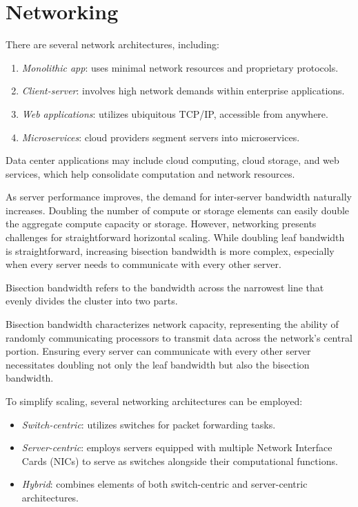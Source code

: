 \section{Networking}

There are several network architectures, including:
\begin{enumerate}
    \item \textit{Monolithic app}: uses minimal network resources and proprietary protocols.
    \item \textit{Client-server}: involves high network demands within enterprise applications.
    \item \textit{Web applications}: utilizes ubiquitous TCP/IP, accessible from anywhere.
    \item \textit{Microservices}: cloud providers segment servers into microservices.
\end{enumerate}
Data center applications may include cloud computing, cloud storage, and web services, which help consolidate computation and network resources.

As server performance improves, the demand for inter-server bandwidth naturally increases. 
Doubling the number of compute or storage elements can easily double the aggregate compute capacity or storage. 
However, networking presents challenges for straightforward horizontal scaling. 
While doubling leaf bandwidth is straightforward, increasing bisection bandwidth is more complex, especially when every server needs to communicate with every other server.
\begin{definition}
    Bisection bandwidth refers to the bandwidth across the narrowest line that evenly divides the cluster into two parts.
\end{definition}
Bisection bandwidth characterizes network capacity, representing the ability of randomly communicating processors to transmit data across the network's central portion. 
Ensuring every server can communicate with every other server necessitates doubling not only the leaf bandwidth but also the bisection bandwidth.

To simplify scaling, several networking architectures can be employed:
\begin{itemize}
    \item \textit{Switch-centric}: utilizes switches for packet forwarding tasks.
    \item \textit{Server-centric}: employs servers equipped with multiple Network Interface Cards (NICs) to serve as switches alongside their computational functions.
    \item \textit{Hybrid}: combines elements of both switch-centric and server-centric architectures.
\end{itemize}

